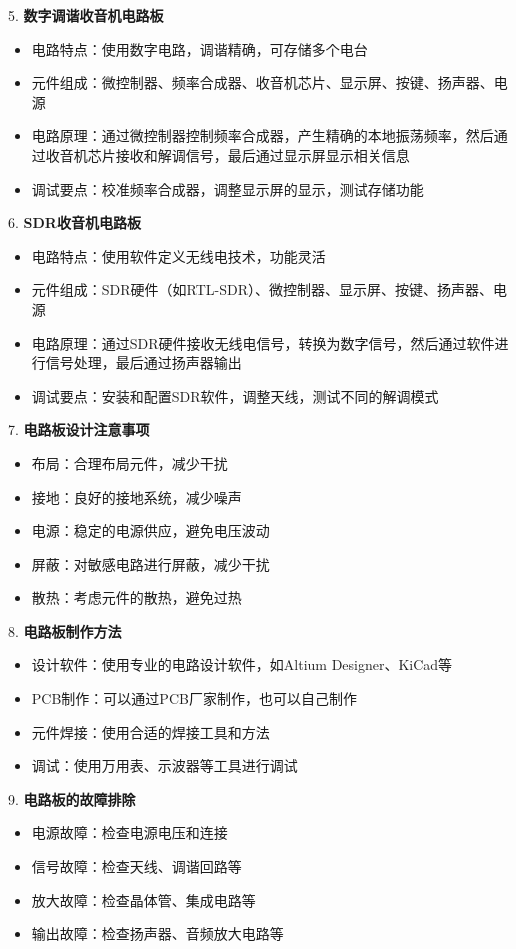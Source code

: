 \documentclass[12pt,UTF8]{ctexbook}
\begin{document}
5. \textbf{数字调谐收音机电路板}
   \begin{itemize}[leftmargin=3.5em]
   \item 电路特点：使用数字电路，调谐精确，可存储多个电台
   \item 元件组成：微控制器、频率合成器、收音机芯片、显示屏、按键、扬声器、电源
   \item 电路原理：通过微控制器控制频率合成器，产生精确的本地振荡频率，然后通过收音机芯片接收和解调信号，最后通过显示屏显示相关信息
   \item 调试要点：校准频率合成器，调整显示屏的显示，测试存储功能
   \end{itemize}

6. \textbf{SDR收音机电路板}
   \begin{itemize}[leftmargin=3.5em]
   \item 电路特点：使用软件定义无线电技术，功能灵活
   \item 元件组成：SDR硬件（如RTL-SDR）、微控制器、显示屏、按键、扬声器、电源
   \item 电路原理：通过SDR硬件接收无线电信号，转换为数字信号，然后通过软件进行信号处理，最后通过扬声器输出
   \item 调试要点：安装和配置SDR软件，调整天线，测试不同的解调模式
   \end{itemize}

7. \textbf{电路板设计注意事项}
   \begin{itemize}[leftmargin=3.5em]
   \item 布局：合理布局元件，减少干扰
   \item 接地：良好的接地系统，减少噪声
   \item 电源：稳定的电源供应，避免电压波动
   \item 屏蔽：对敏感电路进行屏蔽，减少干扰
   \item 散热：考虑元件的散热，避免过热
   \end{itemize}

8. \textbf{电路板制作方法}
   \begin{itemize}[leftmargin=3.5em]
   \item 设计软件：使用专业的电路设计软件，如Altium Designer、KiCad等
   \item PCB制作：可以通过PCB厂家制作，也可以自己制作
   \item 元件焊接：使用合适的焊接工具和方法
   \item 调试：使用万用表、示波器等工具进行调试
   \end{itemize}

9. \textbf{电路板的故障排除}
   \begin{itemize}[leftmargin=3.5em]
   \item 电源故障：检查电源电压和连接
   \item 信号故障：检查天线、调谐回路等
   \item 放大故障：检查晶体管、集成电路等
   \item 输出故障：检查扬声器、音频放大电路等
   \end{itemize}
\end{document}
